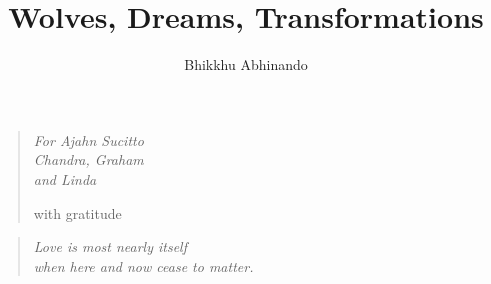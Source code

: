 \documentclass[11pt,twoside,final]{memoir}
\title{Wolves, Dreams, Transformations}
\subtitle{}
\author{Bhikkhu Abhinando}
\date{}
\begin{document}
\emptysheet


\frontmatter*


%


\cleartorecto
\thispagestyle{empty}



\cleartoverso
\thispagestyle{empty}



\cleartorecto
\thispagestyle{empty}
{\raggedleft\vspace*{5em}\par

\begin{quote}
\itshape
For Ajahn Sucitto\\
Chandra, Graham\\
and Linda

with gratitude
\end{quote}

\par}

\cleartorecto
\thispagestyle{empty}
{\raggedleft\vspace*{5em}\par

\begin{quote}
\itshape
Love is most nearly itself\\
when here and now cease to matter.\\
\end{quote}

\par}


\cleartorecto
\tableofcontents*


\mainmatter*
\end{document}

